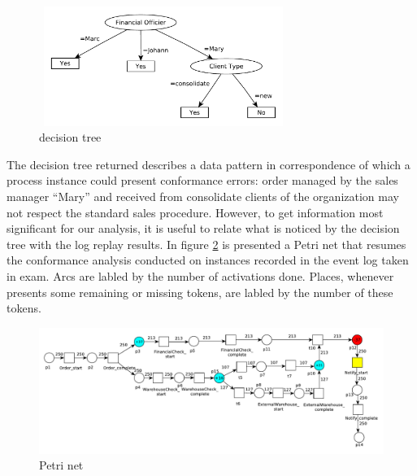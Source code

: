 \documentclass{llncs}
\begin{document}
\begin{figure}[h]
\centering
\includegraphics[width=230pt,height=110pt]
{./items/Sales_tree.pdf}
\caption{decision tree}
\label{salesDecTree}
\end{figure}
The decision tree returned describes a data pattern in correspondence of which a process instance could present conformance errors: order managed by the sales manager ``Mary'' and received from consolidate clients of the organization may not respect the standard sales procedure. However, to get information most significant for our analysis, it is useful to relate what is noticed by the decision tree with the log replay results. In figure \ref{replayResult} is presented a Petri net that resumes the conformance analysis conducted on instances recorded in the event log taken in exam. Arcs are labled by the number of activations done. Places, whenever presents some remaining or missing tokens, are labled by the number of these tokens.\\
\begin{figure}[h]
\includegraphics[width=390pt]
{./items/Sales_PN_result.pdf}
\caption{Petri net}
\label{replayResult}
\end{figure}
\end{document}
